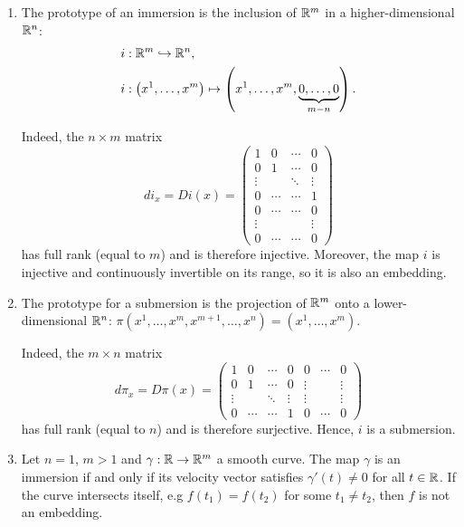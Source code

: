 \begin{ex}
    \begin{enumerate}
        \item The prototype of an immersion is the inclusion of $\mathbb{R}^m$ in a higher-dimensional $\mathbb{R}^n$:
        \begin{align}
            i &: \R^m \hookrightarrow \R^n,\\
            i &: \left(x^1, \ldots, x^m\right) \mapsto \left(x^1, \ldots, x^m, \LaTeXunderbrace{0, \ldots, 0}_{m-n}\right).
        \end{align}
        
        Indeed, the $n\times m$ matrix
        \begin{equation}
            di_x = Di(x)
             = \begin{pmatrix}
                1 & 0 & \cdots & 0 \\
                0 & 1 & \cdots & 0 \\
                \vdots & & \ddots & \vdots \\
                0 & \cdots & \cdots & 1 \\
                0 & \cdots & \cdots & 0 \\
                \vdots & & & \vdots \\
                0 & \cdots & \cdots & 0
             \end{pmatrix}
        \end{equation}
        has full rank (equal to $m$) and is therefore injective.
        Moreover, the map $i$ is injective and continuously invertible on its range, so it is also an embedding.

        \item The prototype for a submersion is the projection of $\mathbb{R}^m$ onto a lower-dimensional $\mathbb{R}^n$: $\pi\left(x^1,\ldots,x^m,x^{m+1},\ldots,x^n\right) = \left(x^1,\ldots,x^m\right)$.
        
        Indeed, the $m\times n$ matrix
        \begin{equation}
            d\pi_x = D\pi(x)
             = \begin{pmatrix}
                1 & 0 & \cdots & 0 & 0 & \cdots & 0 \\
                0 & 1 & \cdots & 0 & \vdots & & \vdots \\
                \vdots & & \ddots & \vdots & \vdots & & \vdots \\
                0 & \cdots & \cdots & 1 & 0 & \cdots & 0
             \end{pmatrix}
        \end{equation}
        has full rank (equal to $n$) and is therefore surjective.
        Hence, $i$ is a submersion.

        \item Let $n=1$, $m > 1$ and $\gamma:\mathbb{R}\to\mathbb{R}^m$ a smooth curve.
        The map $\gamma$ is an immersion if and only if its velocity vector satisfies $\gamma'(t)\neq0$ for all $t\in\mathbb{R}$.
        If the curve intersects itself, e.g $f(t_1) = f(t_2)$ for some $t_1\neq t_2$, then $f$ is not an embedding.
    \end{enumerate}
\end{ex}

